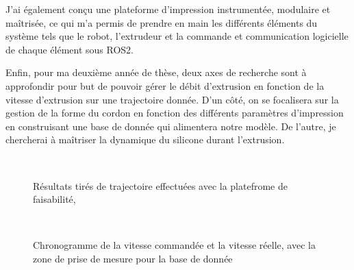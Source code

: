 \documentclass[11pt,a4paper]{article}
\begin{document}
    J'ai également conçu une plateforme d'impression instrumentée, modulaire et maîtrisée, ce qui m'a permis de prendre en main les différents éléments du système tels que le robot, l'extrudeur et la commande et communication logicielle de chaque élément sous ROS2. 

    Enfin, pour ma deuxième année de thèse, deux axes de recherche sont à approfondir pour but de pouvoir gérer le débit d'extrusion en fonction de la vitesse d'extrusion sur une trajectoire donnée. D'un côté, on se focalisera sur la gestion de la forme du cordon en fonction des différents paramètres d'impression en construisant une base de donnée qui alimentera notre modèle. De l'autre, je chercherai à maîtriser la dynamique du silicone durant l'extrusion. 


    \begin{figure}[H]
        \centering
        \def\svgwidth{0.9\columnwidth}
        \caption{Résultats tirés de trajectoire effectuées avec la platefrome de faisabilité, }~\label{fig:resultats_jeremy}
    \end{figure}


    \begin{figure}[H]
        \centering
        \def\svgwidth{0.7\columnwidth}
        \caption{Chronogramme de la vitesse commandée et la vitesse réelle, avec la zone de prise de mesure pour la base de donnée}~\label{fig:chronogrammes}
    \end{figure} 



\end{document}
